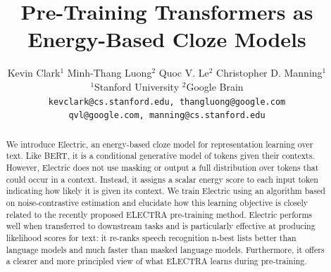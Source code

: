 \documentclass[11pt,a4paper]{article}
\title{Pre-Training Transformers as Energy-Based Cloze Models}
\author{Kevin Clark$^1$ \hspace{3mm} Minh-Thang Luong$^2$ \hspace{3mm} Quoc V. Le$^2$ \hspace{3mm} Christopher D. Manning$^1$\\
   $^1$Stanford University \hspace{6mm} $^2$Google Brain \\
   {\tt kevclark@cs.stanford.edu, thangluong@google.com} \\
   {\tt qvl@google.com, manning@cs.stanford.edu} \\
 }
\date{}
\begin{document}
\maketitle
\begin{abstract}
We introduce Electric, an energy-based cloze model for representation learning over text. 
Like BERT, it is a conditional generative model of tokens given their contexts. 
However, Electric does not use masking or output a full distribution over tokens that could occur in a context.
Instead, it assigns a scalar energy score to each input token indicating how likely it is given its context.
We train Electric using an algorithm based on noise-contrastive estimation and elucidate how this learning objective is closely related to the recently proposed ELECTRA pre-training method. %
Electric performs well when transferred to downstream tasks and is particularly effective at producing likelihood scores for text: it re-ranks speech recognition n-best lists better than language models and much faster than masked language models. Furthermore, it offers a clearer and more principled view of what ELECTRA learns during pre-training.
\end{abstract}
\end{document}
